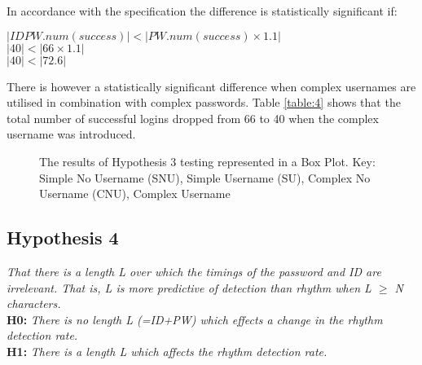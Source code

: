 \documentclass{article}
\begin{document}
In accordance with the specification the difference is statistically significant if: 
\begin{center}
    $ |IDPW.num(success)| < |PW.num(success) \times 1.1|$ \\
    $ |40| < |66 \times 1.1| $ \\
    $ |40| < |72.6| $
\end{center} 

There is however a statistically significant difference when complex usernames are utilised in combination with complex passwords. Table \ref{table:4} shows that the total number of successful logins dropped from 66 to 40 when the complex username was introduced. \\ 

\begin{figure} [H]
    \centering
    \caption{The results of Hypothesis 3 testing represented in a Box Plot. Key: Simple No Username (SNU), Simple Username (SU), Complex No Username (CNU), Complex Username}
    \label{fig:boxPlotHyp3}
\end{figure}

\subsection{Hypothesis 4}
\begin{center}
\textit{That there is a length L over which the timings of the password and ID are
irrelevant. That is, L is more predictive of detection than rhythm when L $\geq$ N characters.} \newline \\

\textbf{H0:} \textit{There	is	no	length	L	(=ID+PW) which	effects	a	change	in	the	rhythm detection	rate.} \newline \\

\textbf{H1:} \textit{There	is	a	length	L	which	affects	the	rhythm	detection	rate.}
\end{center}
\end{document}
